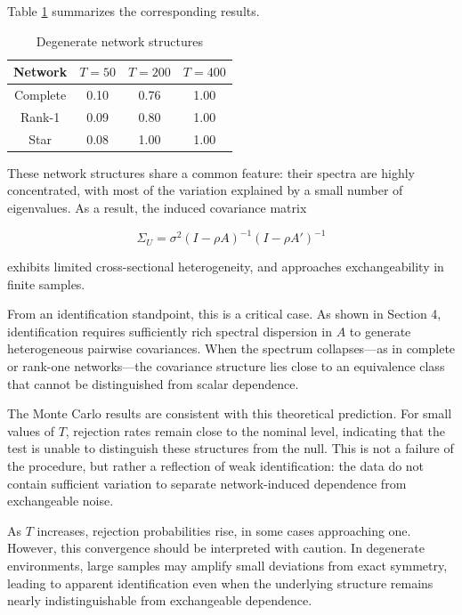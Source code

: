 \documentclass[12pt]{article}
\numberwithin{equation}{section}
\begin{document}
Table \ref{tab:degenerate} summarizes the corresponding results.

\begin{table}[H]
\centering
\caption{Degenerate network structures}
\label{tab:degenerate}
\begin{tabular}{cccc}
\toprule
Network & $T=50$ & $T=200$ & $T=400$ \\
\midrule
Complete & 0.10 & 0.76 & 1.00 \\
Rank-1   & 0.09 & 0.80 & 1.00 \\
Star     & 0.08 & 1.00 & 1.00 \\
\bottomrule
\end{tabular}
\end{table}

These network structures share a common feature: their spectra are highly concentrated, with most of the variation explained by a small number of eigenvalues. As a result, the induced covariance matrix

\begin{equation}
\Sigma_U = \sigma^2 (I - \rho A)^{-1}(I - \rho A')^{-1}
\end{equation}

exhibits limited cross-sectional heterogeneity, and approaches exchangeability in finite samples.

From an identification standpoint, this is a critical case. As shown in Section 4, identification requires sufficiently rich spectral dispersion in $A$ to generate heterogeneous pairwise covariances. When the spectrum collapses—as in complete or rank-one networks—the covariance structure lies close to an equivalence class that cannot be distinguished from scalar dependence.

The Monte Carlo results are consistent with this theoretical prediction. For small values of $T$, rejection rates remain close to the nominal level, indicating that the test is unable to distinguish these structures from the null. This is not a failure of the procedure, but rather a reflection of weak identification: the data do not contain sufficient variation to separate network-induced dependence from exchangeable noise.

As $T$ increases, rejection probabilities rise, in some cases approaching one. However, this convergence should be interpreted with caution. In degenerate environments, large samples may amplify small deviations from exact symmetry, leading to apparent identification even when the underlying structure remains nearly indistinguishable from exchangeable dependence.
\end{document}
